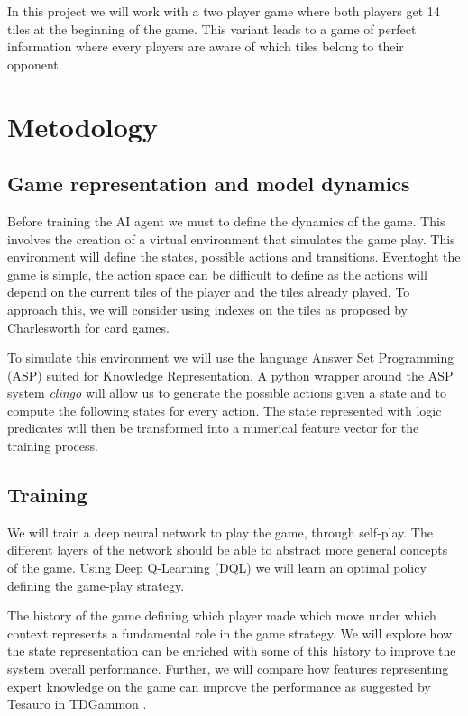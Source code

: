 \documentclass{llncs}
\begin{document}
In this project we will work with a two player game where both players get 14 tiles at the beginning of the game. This variant leads to a game of perfect information where every players are aware of which tiles belong to their opponent. 



\section{Metodology}


\subsection{Game representation and model dynamics}

Before training the AI agent we must to define the dynamics of the game. This involves the creation of a virtual environment that simulates the game play. This environment will define the states, possible actions and transitions. Eventoght the game is simple, the action space can be difficult to define as the actions will depend on the current tiles of the player and the tiles already played. To approach this, we will consider using indexes on the tiles as proposed by Charlesworth\cite{card} for card games.

To simulate this environment we will use the language Answer Set Programming (ASP) \cite{asp} suited for Knowledge Representation. A python wrapper around the ASP system \textit{clingo} will allow us to generate the possible actions given a state and to compute the following states for every action. The state represented with logic predicates will then be transformed into a numerical feature vector for the training process.


\subsection{Training}

We will train a deep neural network to play the game, through self-play. The different layers of the network should be able to abstract more general concepts of the game. Using Deep Q-Learning (DQL) we will learn an optimal policy defining the game-play strategy. 

The history of the game defining which player made which move under which context represents a fundamental role in the game strategy. We will explore how the state representation can be enriched with some of this history to improve the system overall performance. Further, we will compare how features representing expert knowledge on the game can improve the performance as suggested by Tesauro in TDGammon \cite{tdgammon}. 
\end{document}
